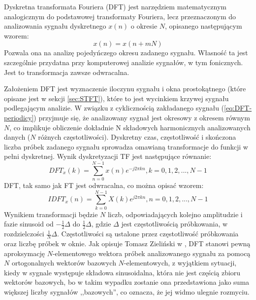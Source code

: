 \documentclass[12pt,a4paper,twoside]{mwart}
\begin{document}
Dyskretna transformata Fouriera (DFT) jest narzędziem matematycznym analogicznym do podstawowej transformaty Fouriera, lecz przeznaczonym do analizowania sygnału dyskretnego $x(n)$ o okresie $N$, opisanego następującym wzorem:
\begin{equation} \label{eq:DFT-periodicy}
  x(n) = x(n + mN)
\end{equation}
Pozwala ona na analizę pojedyńczego okresu zadanego sygnału. Własność ta jest szczególnie przydatna przy komputerowej analizie sygnałów, w tym fonicznych. Jest to transformacja zawsze odwracalna. 

Założeniem DFT jest wyznaczenie iloczynu sygnału i okna prostokątnego (które opisane jest w sekcji \ref{sec:STFT}), które to jest wycinkiem krzywej sygnału podlegającym analizie. W związku z cyklicznością zakładanego sygnału (\ref{eq:DFT-periodicy}) przyjmuje się, że analizowany sygnał jest okresowy z okresem równym $N$, co implikuje obliczenie dokładnie N składowych harmonicznych analizowanych danych ($N$ różnych częstotliwości). Dyskretny czas, częstotliwość i skończona liczba próbek zadanego sygnału sprowadza omawianą transformacje do funkcji w pełni dyskretnej. Wynik dyskretyzacji TF jest następujące równanie:
\begin{equation} \label{eq:DFT}
  DFT_x(k) = \sum_{n = 0}^{N-1} x(n)e^{-j{2 \pi}kn},  k = 0, 1, 2,..., N-1
\end{equation}
DFT, tak samo jak FT jest odwracalna, co można opisać wzorem:
\begin{equation} \label{eq:IDFT}
  IDFT_x(n) = \sum_{k = 0}^{N-1} X(k)e^{j2\pi kn}, n = 0, 1, 2,..., N-1
\end{equation}
Wynikiem transformacji będzie $N$ liczb, odpowiadających kolejno amplitudzie i fazie sinusoid od $- \frac{1}{2} \Delta $ do $\frac{1}{2} \Delta $, gdzie $\Delta$ jest częstotliwością próbkowania, w rozdzielczości $\frac{1}{N} \Delta$. Częstotliwości są ustalone przez częstotliwość próbkowania oraz liczbę próbek w oknie. Jak opisuje Tomasz Zieliński w 
\cite[198 - 200, 204-206]{CyfrowePrzetwarzanieSygnalowOdTeoriiDoZastosowan},
DFT stanowi pewną aproksymację $N$-elementowego wektora próbek analizowanego sygnału za pomocą $N$ ortogonalnych wektorów bazowych $N$-elementowych, z wyjątkiem sytuacji, kiedy w sygnale występuje składowa sinusoidalna, która nie jest częścią zbioru wektorów bazowych, bo w takim wypadku zostanie ona przedstawiona jako suma większej liczby sygnałów ,,bazowych'', co oznacza, że jej widmo ulegnie rozmyciu.
\end{document}
